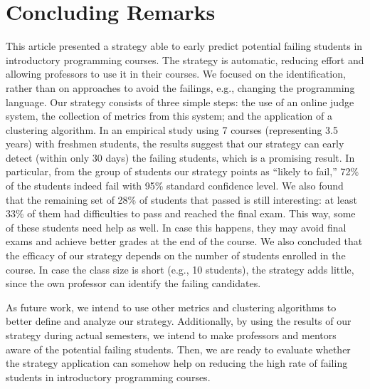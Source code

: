 \section{Concluding Remarks}

\label{sec:conclusion}

This article presented a strategy able to early predict potential failing students in introductory programming courses. The strategy is automatic, reducing effort and allowing professors to use it in their courses. We focused on the identification, rather than on approaches to avoid the failings, e.g., changing the programming language. Our strategy consists of three simple steps: the use of an online judge system, the collection of metrics from this system; and the application of a clustering algorithm. In an empirical study using 7 courses (representing 3.5 years) with freshmen students, the results suggest that our strategy can early detect (within only 30 days) the failing students, which is a promising result. In particular, from the group of students our strategy points as ``likely to fail,'' 72\% of the students indeed fail with 95\% standard confidence level. We also found that the remaining set of 28\% of students that passed is still interesting: at least 33\% of them had difficulties to pass and reached the final exam. This way, some of these students need help as well. In case this happens, they may avoid final exams and achieve better grades at the end of the course. We also concluded that the efficacy of our strategy depends on the number of students enrolled in the course. In case the class size is short (e.g., 10 students), the strategy adds little, since the own professor can identify the failing candidates.

As future work, we intend to use other metrics and clustering algorithms to better define and analyze our strategy. Additionally, by using the results of our strategy during actual semesters, we intend to make professors and mentors aware of the potential failing students. Then, we are ready to evaluate whether the strategy application can somehow help on reducing the high rate of failing students in introductory programming courses.